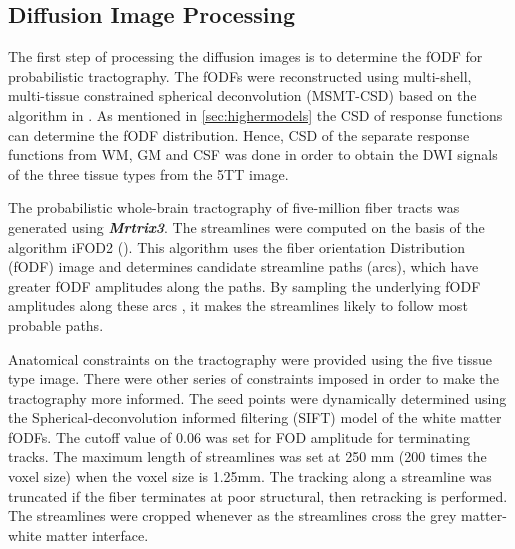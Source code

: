 \documentclass[msthesis.tex]{subfiles}
\begin{document}
\subsection{Diffusion Image Processing}
\label{sec:Diffusionimgprepro}
The first step of processing the diffusion images is to determine the fODF for probabilistic tractography. The fODFs were reconstructed using multi-shell, multi-tissue constrained spherical deconvolution (MSMT-CSD) based on the algorithm in \cite{jeurissen2014multi}. As mentioned in  \autoref{sec:highermodels} the CSD of response functions can determine the fODF distribution. Hence, CSD of the separate response functions from WM, GM and CSF was done in order to obtain the DWI signals of the three tissue types from the 5TT image.

The probabilistic whole-brain tractography of five-million fiber tracts was generated using \textbf{\textit{Mrtrix3}}. The streamlines were computed on the basis of the algorithm iFOD2 (\cite{tournier2010improved}). This algorithm uses the fiber orientation Distribution (fODF) image and determines candidate streamline paths (arcs), which have greater fODF amplitudes along the paths. By sampling the underlying fODF amplitudes along these arcs , it makes the streamlines likely to follow most probable paths.

Anatomical constraints on the tractography were provided using the five tissue type image. There were other series of constraints imposed in order to make the  tractography more informed. The seed points were dynamically determined using the Spherical-deconvolution informed filtering (SIFT) model \cite{smith2013sift} of the white matter fODFs. The cutoff value of 0.06 was set for FOD amplitude for terminating tracks. The maximum length of streamlines was set at 250 mm (200 times the voxel size) when the voxel size is 1.25mm. The tracking along a streamline was truncated if the fiber terminates at poor structural, then  retracking is performed. The streamlines were cropped whenever as the streamlines cross the grey matter-white matter interface. 
\end{document}
